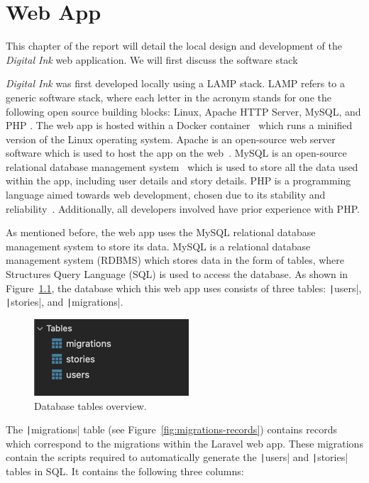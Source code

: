 \chapter{Web App}\label{ch:web-app}

This chapter of the report will detail the local design and development of the \textit{Digital Ink} web application.
We will first discuss the software stack

\textit{Digital Ink} was first developed locally using a LAMP stack.
LAMP refers to a generic software stack, where each letter in the acronym stands for one the following open source building blocks: Linux, Apache HTTP Server, MySQL, and PHP \citep{lee2003open}.
The web app is hosted within a Docker container~\citep{anderson2015docker} which runs a minified version of the Linux operating system.
Apache is an open-source web server software which is used to host the app on the web~\citep{fielding1997apache}.
MySQL is an open-source relational database management system~\citep{widenius2002mysql} which is used to store all the data used within the app, including user details and story details.
PHP is a programming language aimed towards web development, chosen due to its stability and reliability~\citep{lerdorf2002programming}.
Additionally, all developers involved have prior experience with PHP\@.

As mentioned before, the web app uses the MySQL relational database management system to store its data.
MySQL is a relational database management system (RDBMS) which stores data in the form of tables, where Structures Query Language (SQL) is used to access the database.
As shown in Figure~\ref{fig:tables-overview}, the database which this web app uses consists of three tables: \texttt|users|, \texttt|stories|, and \texttt|migrations|.

\begin{figure}[!htbp]
    \centering
    \includegraphics[scale=1]{resources/database/tables-overview}
    \caption{Database tables overview.}
    \label{fig:tables-overview}
\end{figure}

The \texttt|migrations| table (see Figure~\ref{fig:migrations-records}) contains records which correspond to the migrations within the Laravel web app.
These migrations contain the scripts required to automatically generate the \texttt|users| and \texttt|stories| tables in SQL\@.
It contains the following three columns:

